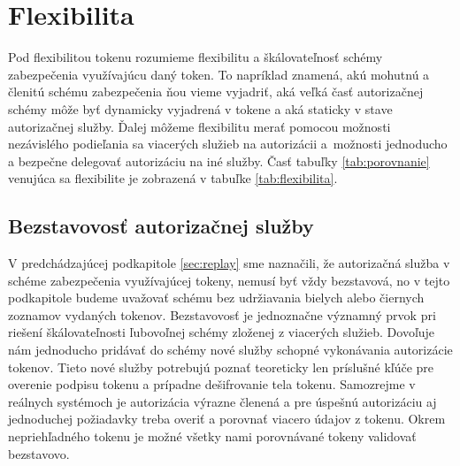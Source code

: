 \section{Flexibilita}

Pod flexibilitou tokenu rozumieme flexibilitu a škálovateľnosť schémy zabezpečenia využívajúcu daný token. To napríklad znamená, akú mohutnú a členitú schému zabezpečenia ňou vieme vyjadriť, aká veľká časť autorizačnej schémy môže byť dynamicky vyjadrená v tokene a aká staticky v stave autorizačnej služby. Ďalej môžeme flexibilitu merať pomocou možnosti nezávislého podieľania sa viacerých služieb na autorizácii a~možnosti jednoducho a bezpečne delegovať autorizáciu na iné služby. Časť tabuľky \ref{tab:porovnanie} venujúca sa flexibilite je zobrazená v tabuľke \ref{tab:flexibilita}.

\begin{table}
  \begin{center}
    \caption{Flexibilita tokenov}
    \label{tab:flexibilita} %

  \end{center}
\end{table}

\subsection{Bezstavovosť autorizačnej služby}

V predchádzajúcej podkapitole \ref{sec:replay} sme naznačili, že autorizačná služba v schéme zabezpečenia využívajúcej tokeny, nemusí byť vždy bezstavová, no v tejto podkapitole budeme uvažovať schému bez udržiavania bielych alebo čiernych zoznamov vydaných tokenov. Bezstavovosť je jednoznačne významný prvok pri riešení škálovateľnosti ľubovoľnej schémy zloženej z viacerých služieb. Dovoľuje nám jednoducho pridávať do schémy nové služby schopné vykonávania autorizácie tokenov. Tieto nové služby potrebujú poznať teoreticky len príslušné kľúče pre overenie podpisu tokenu a prípadne dešifrovanie tela tokenu. Samozrejme v reálnych systémoch je autorizácia výrazne členená a pre úspešnú autorizáciu aj jednoduchej požiadavky treba overiť a porovnať viacero údajov z tokenu. Okrem nepriehľadného tokenu je možné všetky nami porovnávané tokeny validovať bezstavovo.

